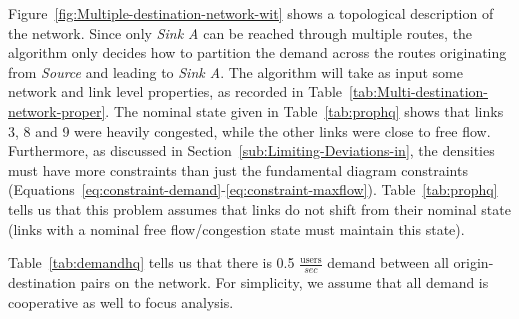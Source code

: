 Figure~\ref{fig:Multiple-destination-network-wit} shows a topological
description of the network. Since only \emph{Sink A }can be reached
through multiple routes, the algorithm only decides how to partition
the demand across the routes originating from \emph{Source} and leading
to \emph{Sink A}. The algorithm will take as input some network and
link level properties, as recorded in Table~\ref{tab:Multi-destination-network-proper}.
The nominal state given in Table~\ref{tab:prophq} shows that links
3, 8 and 9 were heavily congested, while the other links were close
to free flow. Furthermore, as discussed in Section~\ref{sub:Limiting-Deviations-in},
the densities must have more constraints than just the fundamental
diagram constraints (Equations~\eqref{eq:constraint-demand}-\eqref{eq:constraint-maxflow}).
Table~\ref{tab:prophq} tells us that this problem assumes that links
do not shift from their nominal state (links with a nominal free flow/congestion
state must maintain this state).
\begin{table}
\tiny
{}


\protect\caption{\label{tab:Multi-destination-network-proper}Multi-destination network
properties. \textbf{\ref{tab:prophq}:} Link properties, including
nominal state. \textbf{\ref{tab:demandhq}: }demand input into network}
\end{table}
 Table~\ref{tab:demandhq} tells us that there is 0.5 $\frac{\text{users}}{sec}$
demand between all origin-destination pairs on the network. For simplicity,
we assume that all demand is cooperative as well to focus analysis.


